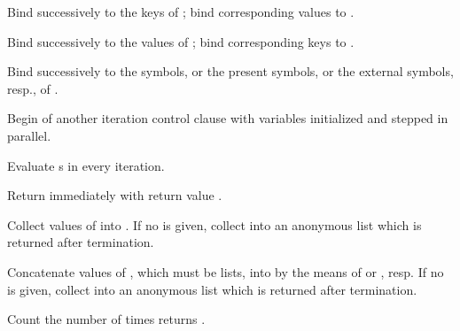 \begin{LIST}{1cm}
\begin{LIST}{.5cm}
\begin{LIST}{.5cm}
      \begin{LIST}{.5cm}

        {
        Bind  successively to the keys of ; bind corresponding values to .
        }

        {
        Bind  successively to the values of ; bind corresponding keys to .
        }

        {
        Bind  successively to the symbols, or the present symbols, or the external symbols, resp., of .
        }

      \end{LIST}
    \end{LIST}
    
    {
    Begin of another iteration control clause with variables initialized and stepped in parallel.
    }

    {
    Evaluate s in every iteration.
    }

    {
    Return immediately with return value .
    }

    {
    Collect values of  into . If no  is given, collect into an anonymous list
    which is returned after termination.
    }

    {
    Concatenate values of , which must be lists, into  by the means of  
    or , resp.  If no  is given, collect into an anonymous list
    which is returned after termination.
    }

    {
    Count the number of times  returns \T.
    }


\end{LIST}
\end{LIST}
